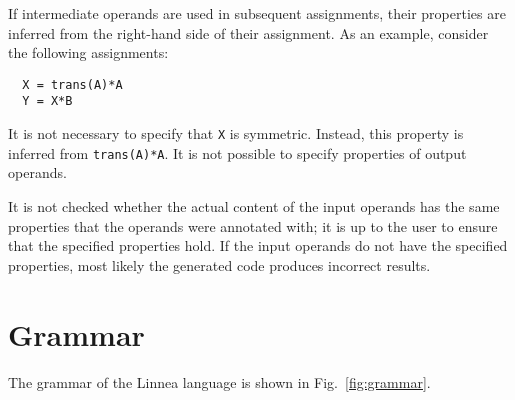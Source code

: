 \documentclass[
  12pt,
  a4paper,
]{scrartcl}
\begin{document}
If intermediate operands are used in subsequent assignments, their properties are inferred from the right-hand side of their assignment. As an example, consider the following assignments:
\begin{verbatim}
  X = trans(A)*A
  Y = X*B
\end{verbatim}
It is not necessary to specify that \texttt{X} is symmetric. Instead, this property is inferred from \texttt{trans(A)*A}. It is not possible to specify properties of output operands.

It is not checked whether the actual content of the input operands has the same properties that the operands were annotated with; it is up to the user to ensure that the specified properties hold. If the input operands do not have the specified properties, most likely the generated code produces incorrect results.

\section{Grammar}

The grammar of the Linnea language is shown in Fig.~\ref{fig:grammar}.

\newcommand{\nt}[1]{\textit{#1}}
\newcommand{\te}[1]{\texttt{#1}}

\renewcommand{\arraystretch}{1.1}
\end{document}
